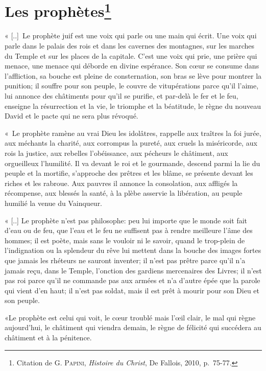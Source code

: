 \section*{Les prophètes\footnote{Citation de \textsc{G. Papini}, \textit{Histoire du Christ}, De Fallois, 2010, p.~75-77.}}
\decalage « [..]~Le prophète juif est une voix qui parle ou une main qui écrit. Une voix qui parle dans le palais des rois et dans les cavernes des montagnes, sur les marches du Temple et sur les places de la capitale. C'est une voix qui prie, une prière qui menace, une menace qui déborde en divine espérance. Son cœur se consume dans l'affliction, sa bouche est pleine de consternation, son bras se lève pour montrer la punition; il souffre pour son peuple, le couvre de vitupérations parce qu'il l'aime, lui annonce des châtiments pour qu'il se purifie, et par-delà le fer et le feu, enseigne la résurrection et la vie, le triomphe et la béatitude, le règne du nouveau David et le pacte qui ne sera plus révoqué.\par
\decalage «~Le prophète ramène au vrai Dieu les idolâtres, rappelle aux traîtres la foi jurée, aux méchants la charité, aux corrompus la pureté, aux cruels la miséricorde, aux rois la justice, aux rebelles l'obéissance, aux pécheurs le châtiment, aux orgueilleux l'humilité. Il va devant le roi et le gourmande, descend parmi la lie du peuple et la mortifie, s'approche des prêtres et les blâme, se présente devant les riches et les rabroue. Aux pauvres il annonce la consolation, aux affligés la récompense, aux blessés la santé, à la plèbe asservie la libération, au peuple humilié la venue du Vainqueur.\par
\decalage « [..] Le prophète n'est pas philosophe: peu lui importe que le monde soit fait d'eau ou de feu, que l'eau et le feu ne suffisent pas à rendre meilleure l'âme des hommes; il est poète, mais sans le vouloir ni le savoir, quand le trop-plein de l'indignation ou la splendeur du rêve lui mettent dans la bouche des images fortes que jamais les rhéteurs ne sauront inventer; il n'est pas prêtre parce qu'il n'a jamais reçu, dans le Temple, l'onction des gardiens mercenaires des Livres; il n'est pas roi parce qu'il ne commande pas aux armées et n'a d'autre épée que la parole qui vient d'en haut; il n'est pas soldat, mais il est prêt à mourir pour son Dieu et son peuple. \par
\decalage «Le prophète est celui qui voit, le cœur troublé mais l'œil clair, le mal qui règne aujourd'hui, le châtiment qui viendra demain, le règne de félicité qui succédera au châtiment et à la pénitence.\par
